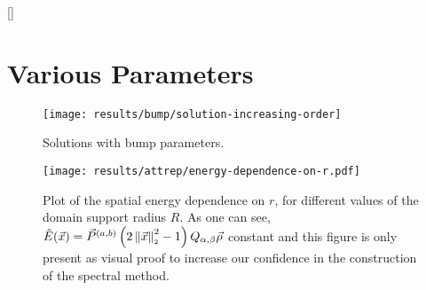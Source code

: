 \appendix
{}[\vspace{4.5cm}]
\titlespacing{\chapter}{0cm}{0cm}{0cm}

\chapter{Various Parameters}
\label{chap:appendix}

\begin{figure}[H]
  \centering
  \texttt{[image: results/bump/solution-increasing-order]}
  \caption[Bump parameter solutions]{Solutions with bump parameters.}
  \label{fig:bump-solutions}
\end{figure}

\begin{figure}[H]
  \centering
  \texttt{[image: results/attrep/energy-dependence-on-r.pdf]}
  \caption[Spatial energy dependence on $r$]{Plot of the spatial energy dependence on $r$, for different values of the domain support radius $R$. As one can see, $\tilde{E}(\vec{x}) = \vec{P}^{(a, b)}\left(2 \left\lVert\vec{x}\right\rVert_{\scriptscriptstyle 2}^2 - 1\right) Q_{\alpha,\beta} \vec{\rho}$ constant and this figure is only present as visual proof to increase our confidence in the construction of the spectral method.}
  \label{fig:spatial-energy-dependence}
\end{figure}

